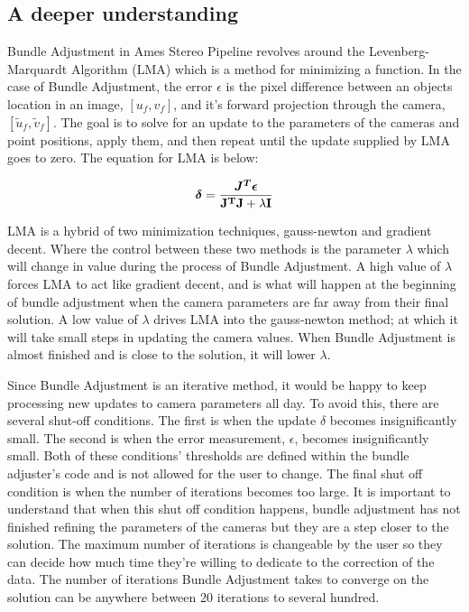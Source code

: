 \subsection{A deeper understanding}

Bundle Adjustment in Ames Stereo Pipeline revolves around the
Levenberg-Marquardt Algorithm (LMA) which is a method for minimizing a
function. In the case of Bundle Adjustment, the error $\epsilon$ is
the pixel difference between an objects location in an image,
$[u_{f},v_{f}]$, and it's forward projection through the camera,
$[\tilde{u}_{f},\tilde{v}_{f}]$. The goal is to solve for an update to
the parameters of the cameras and point positions, apply them, and
then repeat until the update supplied by LMA goes to zero. The
equation for LMA is below:

\begin{equation}
\mbox{\boldmath$\delta$} = \frac{\mbox{\boldmath$J^T\epsilon$}}{\bf{J^TJ}+\lambda\bf{I}}
\label{eqn: Levenberg-Marquardt Algorithm}
\end{equation}

LMA is a hybrid of two minimization techniques, gauss-newton and
gradient decent. Where the control between these two methods is the
parameter $\lambda$ which will change in value during the process of
Bundle Adjustment. A high value of $\lambda$ forces LMA to act like
gradient decent, and is what will happen at the beginning of bundle
adjustment when the camera parameters are far away from their final
solution. A low value of $\lambda$ drives LMA into the gauss-newton
method; at which it will take small steps in updating the camera
values. When Bundle Adjustment is almost finished and is close to the
solution, it will lower $\lambda$.

Since Bundle Adjustment is an iterative method, it would be happy to
keep processing new updates to camera parameters all day. To avoid
this, there are several shut-off conditions. The first is when the
update {\boldmath$\delta$} becomes insignificantly small. The second
is when the error measurement, {\boldmath$\epsilon$}, becomes
insignificantly small. Both of these conditions' thresholds are
defined within the bundle adjuster's code and is not allowed for the
user to change. The final shut off condition is when the number of
iterations becomes too large. It is important to understand that when
this shut off condition happens, bundle adjustment has not finished
refining the parameters of the cameras but they are a step closer to
the solution. The maximum number of iterations is changeable by the
user so they can decide how much time they're willing to dedicate to
the correction of the data. The number of iterations Bundle Adjustment
takes to converge on the solution can be anywhere between 20
iterations to several hundred.


